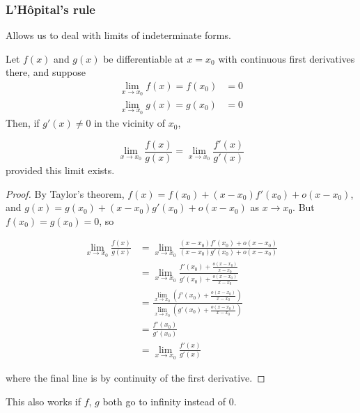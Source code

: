 \documentclass{../template/note}
\begin{document}
    \subsubsection{L'H\^opital's rule}

    Allows us to deal with limits of indeterminate forms.

    \begin{theorem}
        Let \(f(x)\) and \(g(x)\) be differentiable at \(x=x_0\) with continuous first derivatives there, and suppose
        \begin{align*}
            \lim_{x \to x_0}f(x) = f(x_0) &= 0 \\
            \lim_{x \to x_0}g(x) = g(x_0) &= 0
        \end{align*}
        Then, if \(g'(x) \neq 0\) in the vicinity of \(x_0\),

        \[
            \lim_{x \to x_0} \frac{f(x)}{g(x)} = \lim_{x \to x_0} \frac{f'(x)}{g'(x)}
        \]
        provided this limit exists.
        
    \end{theorem}
    
    \begin{proof}
        By Taylor's theorem, \(f(x) = f(x_0) + (x-x_0)f'(x_0) + o(x-x_0)\), and \(g(x) = g(x_0) + (x-x_0)g'(x_0) + o(x-x_0)\) as \(x \to x_0\). But \(f(x_0) = g(x_0) = 0\), so

        \begin{align*}
            \lim_{x \to x_0} \frac{f(x)}{g(x)} &= \lim_{x\to x_0}\frac{(x-x_0)f'(x_0) + o(x-x_0)}{(x-x_0)g'(x_0) + o(x-x_0)} \\
            &= \lim_{x\to x_0}\frac{f'(x_0) + \frac{o(x-x_0)}{x-x_0}}{g'(x_0) + \frac{o(x-x_0)}{x-x_0}} \\
            &= \frac{\lim_{x\to x_0}\left(f'(x_0) + \frac{o(x-x_0)}{x-x_0}\right)}{\lim_{x\to x_0}\left(g'(x_0) + \frac{o(x-x_0)}{x-x_0}\right)} \\
            &= \frac{f'(x_0)}{g'(x_0)} \\
            &= \lim_{x \to x_0} \frac{f'(x)}{g'(x)}
        \end{align*}
        
        where the final line is by continuity of the first derivative.
        
    \end{proof}

    \begin{remark*}
        This also works if \(f\), \(g\) both go to infinity instead of 0.
    \end{remark*}
\end{document}
